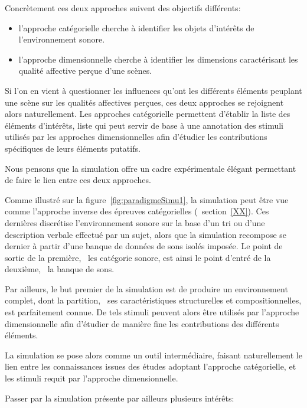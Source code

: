 Concrètement ces deux approches suivent des objectifs différents: 

\begin{itemize}
\item l'approche catégorielle cherche à identifier les objets d'intérêts de l'environnement sonore.
\item l'approche dimensionnelle cherche à identifier les dimensions caractérisant les qualité affective perçue d'une scènes.
\end{itemize}

Si l'on  en vient à questionner les influences qu'ont les différents éléments peuplant une scène sur les qualités affectives perçues, ces deux approches se rejoignent alors naturellement. Les approches catégorielle permettent d'établir la liste des éléments d'intérêts, liste qui peut servir de base à une annotation des stimuli utilisés par les approches dimensionnelles afin d'étudier les contributions spécifiques de leurs éléments putatifs.

Nous pensons que la simulation offre un cadre expérimentale élégant permettant de faire le lien entre ces deux approches.

Comme illustré sur la figure~\ref{fig:paradigmeSimu1}, la simulation peut être vue comme l'approche inverse des épreuves catégorielles (\cf~section~\ref{XX}). Ces dernières discrétise l'environnement sonore sur la base d'un tri ou d'une description verbale effectué par un sujet, alors que la simulation recompose se dernier à partir d'une banque de données de sons isolés imposée. Le point de sortie de la première, \ie~les catégorie sonore, est ainsi le point d'entré de la deuxième, \ie~la banque de sons.

Par ailleurs, le but premier de la simulation est de produire un environnement complet, dont la partition, \ie~ses caractéristiques structurelles et compositionnelles, est parfaitement connue. De tels stimuli peuvent alors être utilisés par l'approche dimensionnelle afin d'étudier de manière fine les contributions des différents éléments.

La simulation se pose alors comme un outil intermédiaire, faisant naturellement le lien entre les connaissances issues des études adoptant l'approche catégorielle, et les stimuli requit par l'approche dimensionnelle.

Passer par la simulation présente par ailleurs plusieurs intérêts:


